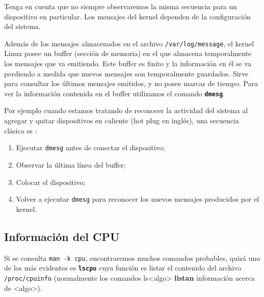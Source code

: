 \documentclass[12pt]{article}
\begin{document}
Tenga en cuenta que no siempre observaremos la misma secuencia para un dispositivo en particular. 
Los mensajes del kernel dependen de la configuración del sistema.


Además de los mensajes almacenados en el archivo \texttt{/var/log/message}, el kernel Linux posee un buffer 
(sección de memoria) en el que almacena temporalmente los mensajes que va emitiendo. Este buffer es 
finito y la información en él se va perdiendo a medida que nuevos mensajes son temporalmente guardados. Sirve para 
consultar los últimos mensajes emitidos, y no posee marcas de tiempo. Para ver la información contenida en el 
buffer utilizamos el comando \texttt{\textbf{dmesg}}. 

Por ejemplo cuando estamos tratando de reconocer la actividad del sistema al agregar y quitar 
dispositivos en caliente (hot plug en inglés), una secuencia clásica es :

\begin{enumerate}
	\item Ejecutar \texttt{dmesg} antes de conectar el dispositivo;
	\item Observar la última línea del buffer;
	\item Colocar el dispositivo;
	\item Volver a ejecutar \texttt{dmesg} para reconocer los nuevos mensajes producidos por el kernel.
\end{enumerate}


\subsection*{Información del CPU}

Si se consulta \texttt{man -k cpu}, encontraremos muchos comandos probables, quizá 
uno de los más evidentes es \textbf{\texttt{lscpu}} cuya función es listar el contenido del archivo 
\texttt{/proc/cpuinfo} (normalmente los comandos ls{\textless}algo\textgreater  
\textbf{listan} información acerca de {\textless}algo\textgreater).
\end{document}
